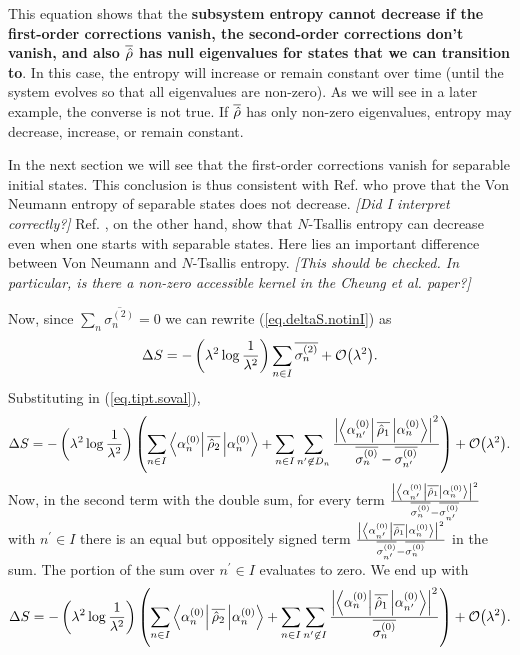 This equation shows that the {\bf subsystem entropy cannot decrease if the first-order corrections vanish, the second-order corrections don't vanish, and also \(\overline{\hat{\rho}}\) has null eigenvalues for states that we can transition to}. In this case, the entropy will increase or remain constant over time (until the system evolves so that all eigenvalues are non-zero). As we will see in a later example, the converse is not true. If \(\overline{\hat{\rho}}\) has only non-zero eigenvalues, entropy may decrease, increase, or remain constant.

In the next section we will see that the first-order corrections vanish for separable initial states. This conclusion is thus consistent with Ref. \cite{bracken} who prove that the Von Neumann entropy of separable states does not decrease. \emph{[Did I interpret \cite{bracken} correctly?]} Ref. \cite{cheung}, on the other hand, show that \(N\)-Tsallis entropy can decrease even when one starts with separable states. Here lies an important difference between Von Neumann and \(N\)-Tsallis entropy. \emph{[This should be checked. In particular, is there a non-zero accessible kernel in the Cheung et al. paper?]}

Now, since \(\sum_{n} \overline{\sigma_n^{(2)}}= 0\) we can rewrite (\ref{eq.deltaS.notinI}) as
\begin{equation}\label{eq.deltaS}
\Delta S = -\left(\lambda^2\log\frac{1}{\lambda^{2}} \right)\sum_{n \in I} \overline{\sigma_n^{(2)}} + \mathcal{O}{\left(\lambda^2\right)}.
\end{equation}
Substituting in (\ref{eq.tipt.soval}),
\[
\Delta S = -\left(\lambda^2 \log\frac{1}{\lambda^2}\right)\left(\sum_{n \in I} \left\langle\alpha_n^{(0)}\right|\overline{\hat{\rho}_2}\left|\alpha_n^{(0)}\right\rangle +  \sum_{n \in I} \sum_{{n^\prime} \not\in D_n} \frac{\left|\left\langle\alpha_{n^\prime}^{(0)}\right| \overline{\hat{\rho}_1} \left|\alpha_n^{(0)}\right\rangle\right|^2}{\overline{\sigma_n^{(0)}}-\overline{\sigma_{n^\prime}^{(0)}}} \right)+ \mathcal{O}{\left(\lambda^2\right)}.
\]
Now, in the second term with the double sum, for every term \(\frac{\left|\left\langle\alpha_{n^\prime}^{(0)}\right| \overline{\hat{\rho}_1} \left|\alpha_n^{(0)}\right\rangle\right|^2}{\overline{\sigma_n^{(0)}}-\overline{\sigma_{n^\prime}^{(0)}}}\) with \(n^\prime \in I\) there is an equal but oppositely signed term \(\frac{\left|\left\langle\alpha_{n^\prime}^{(0)}\right| \overline{\hat{\rho}_1} \left|\alpha_n^{(0)}\right\rangle\right|^2}{\overline{\sigma_{n^\prime}^{(0)}}-\overline{\sigma_n^{(0)}}}\) in the sum. The portion of the sum over \(n^\prime \in I\) evaluates to zero. We end up with
\begin{equation}\label{eq.deltaSso.intermediate}
\Delta S = -\left(\lambda^2 \log\frac{1}{\lambda^2}\right)\left(\sum_{n \in I} \left\langle\alpha_n^{(0)}\right|\overline{\hat{\rho}_2}\left|\alpha_n^{(0)}\right\rangle +  \sum_{n \in I} \sum_{n^\prime \not\in I} \frac{\left|\left\langle\alpha_{n}^{(0)}\right| \overline{\hat{\rho}_1} \left|\alpha_{n^\prime}^{(0)}\right\rangle\right|^2}{\overline{\sigma_n^{(0)}}} \right)+ \mathcal{O}{\left(\lambda^2\right)}.
\end{equation}

